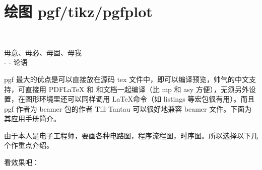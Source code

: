 \chapter{绘图  pgf/tikz/pgfplot}
\thispagestyle{fancy}
~\\[9cm]
\begin{flushright}
\kai\xiaosi
\textcolor[rgb]{0.00,0.50,0.00}{
毋意、毋必、毋固、毋我\\
- - 论语}
\end{flushright}
\clearpage

    pgf 最大的优点是可以直接放在源码 tex 文件中，即可以编译预览，帅气的中文支持，可直接用 PDFLaTeX 和 \XeLaTeX 和文档一起编译（比 mp 和 asy 方便），无须另外设置，在图形环境里还可以同样调用 \LaTeX 命令（如 listings 等宏包很有用）。而且 pgf 作者为 beamer 包的作者 Till Tantau 可以很好地兼容 beamer 文件。下面为其应用手册简介。

    由于本人是电子工程师，要画各种电路图，程序流程图，时序图。所以选择以下几个作重点介绍。




看效果吧：

